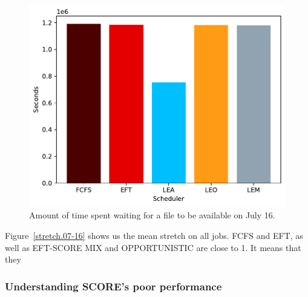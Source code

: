 \documentclass[conference,10pt]{IEEEtran}
\begin{document}
\begin{figure}[tb]\centering\includegraphics[scale=0.47]{../MBSS/plot/Results_FCFS_Score_Backfill_2022-07-16->2022-07-16_V10000_Total_waiting_for_a_load_time_and_transfer_time_450_128_32_256_4_1024.pdf}\caption{Amount of time spent waiting for a file to be available on July 16.}\label{load.07-16}\end{figure}

Figure~\ref{stretch.07-16} shows us the mean stretch on all jobs.
FCFS and EFT, as well as EFT-SCORE MIX and OPPORTUNISTIC are close to 1.
It means that they 

\subsubsection{Understanding SCORE's poor performance}
\end{document}
